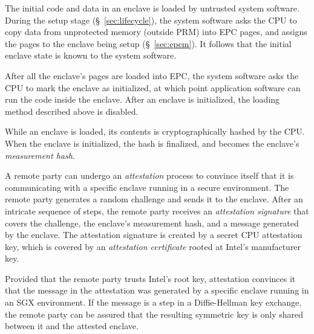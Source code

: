 The initial code and data in an enclave is loaded by untrusted system software.
During the setup stage (\S~\ref{sec:lifecycle}), the system software asks the
CPU to copy data from unprotected memory (outside PRM) into EPC pages, and
assigns the pages to the enclave being setup (\S~\ref{sec:epcm}). It follows
that the initial enclave state is known to the system software.

After all the enclave's pages are loaded into EPC, the system software asks the
CPU to mark the enclave as initialized, at which point application software can
run the code inside the enclave. After an enclave is initialized, the loading
method described above is disabled.

While an enclave is loaded, its contents is cryptographically hashed by the
CPU. When the enclave is initialized, the hash is finalized, and becomes the
enclave's \textit{measurement hash}.

A remote party can undergo an \textit{attestation} process to convince itself
that it is communicating with a specific enclave running in a secure
environment. The remote party generates a random challenge and sends it to the
enclave. After an intricate sequence of steps, the remote party receives an
\textit{attestation signature} that covers the challenge, the enclave's
measurement hash, and a message generated by the enclave. The attestation
signature is created by a secret CPU attestation key, which is covered by an
\textit{attestation certificate} rooted at Intel's manufacturer key.

Provided that the remote party trusts Intel's root key, attestation convinces
it that the message in the attestation was generated by a specific enclave
running in an SGX environment. If the message is a step in a Diffie-Hellman key
exchange, the remote party can be assured that the resulting symmetric key is
only shared between it and the attested enclave.
